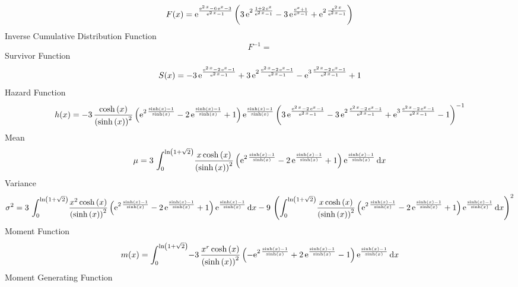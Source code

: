 \documentclass[12pt]{article}
\begin{document}
 $$F(x)={{\rm e}^{{\frac {{{\rm e}^{2\,x}}-6\,{{\rm e}^{x}}-3}{{{\rm e}^{2\,x}
}-1}}}} \left( 3\,{{\rm e}^{2\,{\frac {1+2\,{{\rm e}^{x}}}{{{\rm e}^{2
\,x}}-1}}}}-3\,{{\rm e}^{{\frac {{{\rm e}^{x}}+1}{{{\rm e}^{x}}-1}}}}+
{{\rm e}^{2\,{\frac {{{\rm e}^{2\,x}}}{{{\rm e}^{2\,x}}-1}}}} \right) 
$$ Inverse Cumulative Distribution Function 
  $$F^{-1} =     
$$Survivor Function 
 $$ S(x)=-3\,{{\rm e}^{{\frac {{{\rm e}^{2\,x}}-2\,{{\rm e}^{x}}-1}{{{\rm e}^{2
\,x}}-1}}}}+3\,{{\rm e}^{2\,{\frac {{{\rm e}^{2\,x}}-2\,{{\rm e}^{x}}-
1}{{{\rm e}^{2\,x}}-1}}}}-{{\rm e}^{3\,{\frac {{{\rm e}^{2\,x}}-2\,{
{\rm e}^{x}}-1}{{{\rm e}^{2\,x}}-1}}}}+1
$$ Hazard Function 
 $$ h(x)=-3\,{\frac {\cosh \left( x \right) }{ \left( \sinh \left( x \right) 
 \right) ^{2}} \left( {{\rm e}^{2\,{\frac {\sinh \left( x \right) -1}{
\sinh \left( x \right) }}}}-2\,{{\rm e}^{{\frac {\sinh \left( x
 \right) -1}{\sinh \left( x \right) }}}}+1 \right) {{\rm e}^{{\frac {
\sinh \left( x \right) -1}{\sinh \left( x \right) }}}} \left( 3\,{
{\rm e}^{{\frac {{{\rm e}^{2\,x}}-2\,{{\rm e}^{x}}-1}{{{\rm e}^{2\,x}}
-1}}}}-3\,{{\rm e}^{2\,{\frac {{{\rm e}^{2\,x}}-2\,{{\rm e}^{x}}-1}{{
{\rm e}^{2\,x}}-1}}}}+{{\rm e}^{3\,{\frac {{{\rm e}^{2\,x}}-2\,{
{\rm e}^{x}}-1}{{{\rm e}^{2\,x}}-1}}}}-1 \right) ^{-1}}
$$Mean 
 $$ \mu=3\,\int_{0}^{\ln  \left( 1+\sqrt {2} \right) }\!{\frac {x\cosh \left( 
x \right) }{ \left( \sinh \left( x \right)  \right) ^{2}} \left( {
{\rm e}^{2\,{\frac {\sinh \left( x \right) -1}{\sinh \left( x \right) 
}}}}-2\,{{\rm e}^{{\frac {\sinh \left( x \right) -1}{\sinh \left( x
 \right) }}}}+1 \right) {{\rm e}^{{\frac {\sinh \left( x \right) -1}{
\sinh \left( x \right) }}}}}\,{\rm d}x
$$ Variance 
 $$ \sigma^2 = 3\,\int_{0}^{\ln  \left( 1+\sqrt {2} \right) }\!{\frac {{x}^{2}\cosh
 \left( x \right) }{ \left( \sinh \left( x \right)  \right) ^{2}}
 \left( {{\rm e}^{2\,{\frac {\sinh \left( x \right) -1}{\sinh \left( x
 \right) }}}}-2\,{{\rm e}^{{\frac {\sinh \left( x \right) -1}{\sinh
 \left( x \right) }}}}+1 \right) {{\rm e}^{{\frac {\sinh \left( x
 \right) -1}{\sinh \left( x \right) }}}}}\,{\rm d}x-9\, \left( \int_{0
}^{\ln  \left( 1+\sqrt {2} \right) }\!{\frac {x\cosh \left( x \right) 
}{ \left( \sinh \left( x \right)  \right) ^{2}} \left( {{\rm e}^{2\,{
\frac {\sinh \left( x \right) -1}{\sinh \left( x \right) }}}}-2\,{
{\rm e}^{{\frac {\sinh \left( x \right) -1}{\sinh \left( x \right) }}}
}+1 \right) {{\rm e}^{{\frac {\sinh \left( x \right) -1}{\sinh \left( 
x \right) }}}}}\,{\rm d}x \right) ^{2}
$$Moment Function 
 $$ m(x) = \int_{0}^{\ln  \left( 1+\sqrt {2} \right) }\!-3\,{\frac {{x}^{r}\cosh
 \left( x \right) }{ \left( \sinh \left( x \right)  \right) ^{2}}
 \left( -{{\rm e}^{2\,{\frac {\sinh \left( x \right) -1}{\sinh \left( 
x \right) }}}}+2\,{{\rm e}^{{\frac {\sinh \left( x \right) -1}{\sinh
 \left( x \right) }}}}-1 \right) {{\rm e}^{{\frac {\sinh \left( x
 \right) -1}{\sinh \left( x \right) }}}}}\,{\rm d}x
$$ Moment Generating Function 
\end{document}
